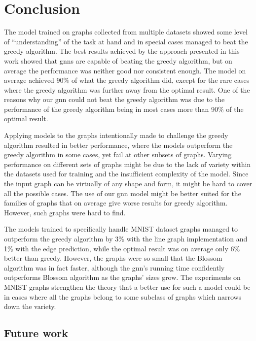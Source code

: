 \chapter{Conclusion}

The model trained on graphs collected from multiple datasets showed some level of “understanding” of the task at hand and in special cases managed to beat the greedy algorithm. The best results achieved by the approach presented in this work showed that \gls{gnn}s are capable of beating the greedy algorithm, but on average the performance was neither good nor consistent enough. The model on average achieved 90\% of what the greedy algorithm did, except for the rare cases where the greedy algorithm was further away from the optimal result. One of the reasons why our \gls{gnn} could not beat the greedy algorithm was due to the performance of the greedy algorithm being in most cases more than 90\% of the optimal result.

Applying models to the graphs intentionally made to challenge the greedy algorithm resulted in better performance, where the models outperform the greedy algorithm in some cases, yet fail at other subsets of graphs. Varying performance on different sets of graphs might be due to the lack of variety within the datasets used for training and the insufficient complexity of the model. Since the input graph can be virtually of any shape and form, it might be hard to cover all the possible cases. The use of our \gls{gnn} model might be better suited for the families of graphs that on average give worse results for greedy algorithm. However, such graphs were hard to find.

The models trained to specifically handle MNIST dataset graphs managed to outperform the greedy algorithm by 3\% with the line graph implementation and 1\% with the edge prediction, while the optimal result was on average only 6\% better than greedy. However, the graphs were so small that the Blossom algorithm was in fact faster, although the \gls{gnn}'s running time confidently outperforms Blossom algorithm as the graphs' sizes grow. The experiments on MNIST graphs strengthen the theory that a better use for such a model could be in cases where all the graphs belong to some subclass of graphs which narrows down the variety. 

\section{Future work}

